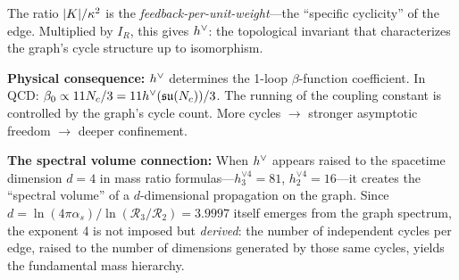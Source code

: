 The ratio $|K|/\kappa^2$ is the \emph{feedback-per-unit-weight}---the ``specific cyclicity'' of the edge. Multiplied by $I_R$, this gives $h^\vee$: the topological invariant that characterizes the graph's cycle structure up to isomorphism.

\textbf{Physical consequence:} $h^\vee$ determines the 1-loop $\beta$-function coefficient. In QCD: $\beta_0 \propto 11 N_c / 3 = 11 h^\vee(\mathfrak{su}(N_c)) / 3$. The running of the coupling constant is controlled by the graph's cycle count. More cycles $\to$ stronger asymptotic freedom $\to$ deeper confinement.

\textbf{The spectral volume connection:} When $h^\vee$ appears raised to the spacetime dimension $d = 4$ in mass ratio formulas---$h_3^{\vee 4} = 81$, $h_2^{\vee 4} = 16$---it creates the ``spectral volume'' of a $d$-dimensional propagation on the graph. Since $d = \ln(4\pi\alpha_s)/\ln(\mathcal{R}_3/\mathcal{R}_2) = 3.9997$ itself emerges from the graph spectrum, the exponent 4 is not imposed but \emph{derived}: the number of independent cycles per edge, raised to the number of dimensions generated by those same cycles, yields the fundamental mass hierarchy.
